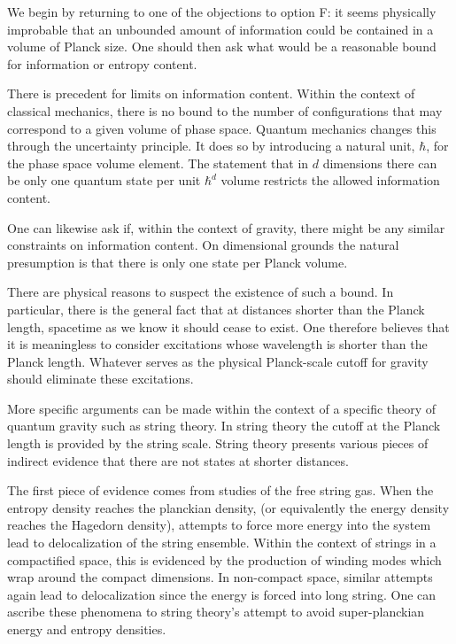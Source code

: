 \itemskip
We begin by returning to one of the objections to option F:
it seems physically improbable that
an unbounded amount of information could be
contained in a volume of Planck size.  One should then ask what would be
a reasonable bound for information or entropy content.

There is precedent for limits on information content.
Within the context of classical mechanics, there is no bound to the
number of configurations that may correspond to a given volume of phase
space.  Quantum mechanics changes this through the uncertainty
principle.  It does so
by introducing
a  natural unit,
$\hbar$,
for the phase space volume element.
The statement that in $d$ dimensions there  can be only
one quantum state per unit $\hbar^d$ volume  restricts the
allowed information content.

One can likewise ask if, within the context of gravity, there might
be any similar constraints on information content.
On dimensional grounds the natural presumption is that there is
only one state per Planck volume.

There are physical reasons to suspect the existence
of such a bound.  In particular, there
is the general fact that at distances shorter
than the Planck length, spacetime as we know it should cease to exist.
One therefore believes that it is meaningless to consider excitations
whose wavelength is shorter than the Planck length.  Whatever serves
as the physical Planck-scale cutoff for gravity should eliminate
these excitations.

More specific arguments can be made within the context of a specific
theory of quantum gravity such as string theory.  In string theory
the cutoff at the Planck length is provided by the string scale.
String theory presents
various pieces of indirect evidence  that
there are not states at shorter distances.

The first piece of evidence comes from studies of the free string
gas.  When the entropy density reaches the planckian density, (or
equivalently the energy density reaches the Hagedorn density),
attempts to force more energy into the system lead to delocalization
of the string ensemble.  Within the context of strings in a
compactified space, this is evidenced by the production of winding
modes which wrap around the compact
dimensions.  In non-compact space, similar attempts again lead to
delocalization since the energy is forced into long
string.  One can
ascribe these phenomena to string theory's attempt to avoid
super-planckian energy
and entropy densities.

